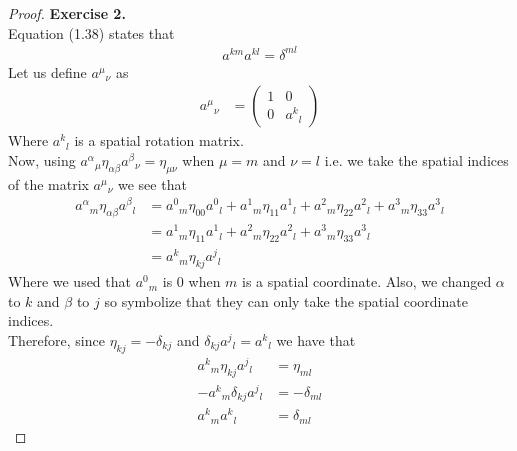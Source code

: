 \documentclass[11pt]{article}
\theoremstyle{definition}
\begin{document}
\cleardoublepage
\begin{proof}{\textbf{Exercise 2.}}\\
Equation (1.38) states that
\begin{align*}
    a^{km} a^{kl} = \delta^{ml}
\end{align*}
Let us define ${a^{\mu}}_\nu$ as 
\begin{align*}
    {a^{\mu}}_\nu
    &= \begin{pmatrix}
        1 & 0 \\
        0 & {a^k}_l
    \end{pmatrix}
\end{align*}
Where ${a^k}_l$ is a spatial rotation matrix.\\
Now, using ${a^\alpha}_\mu \eta_{\alpha\beta} {a^\beta}_\nu = \eta_{\mu\nu}$
when $\mu = m$ and $\nu = l$ i.e. we take the spatial indices of the matrix
${a^\mu}_\nu$ we see that
\begin{align*}
    {a^\alpha}_m \eta_{\alpha\beta} {a^\beta}_l 
    &= {a^0}_m \eta_{00} {a^0}_l
    + {a^1}_m \eta_{11} {a^1}_l
    + {a^2}_m \eta_{22} {a^2}_l
    + {a^3}_m \eta_{33} {a^3}_l \\
    &= {a^1}_m \eta_{11} {a^1}_l
    + {a^2}_m \eta_{22} {a^2}_l
    + {a^3}_m \eta_{33} {a^3}_l \\
    &= {a^k}_m \eta_{kj} {a^j}_l
\end{align*}
Where we used that ${a^0}_m$ is 0 when $m$ is a spatial coordinate.
Also, we changed $\alpha$ to $k$ and $\beta$ to $j$ so symbolize that they can
only take the spatial coordinate indices.\\
Therefore, since $\eta_{kj} = -\delta_{kj}$ and $\delta_{kj} {a^j}_l = {a^k}_l$
we have that
\begin{align*}
    {a^k}_m \eta_{kj} {a^j}_l &= \eta_{ml} \\
    -{a^k}_m \delta_{kj} {a^j}_l &= -\delta_{ml}\\
    {a^k}_m {a^k}_l &= \delta_{ml}
\end{align*}
\end{proof}
\end{document}
